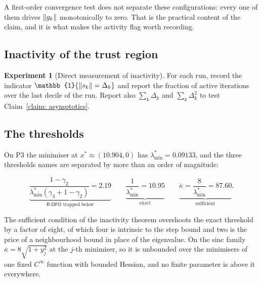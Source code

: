 \documentclass[11pt]{article}
\theoremstyle{plain}
\theoremstyle{definition}
\newtheorem{experiment}{Experiment}
\theoremstyle{remark}
\numberwithin{equation}{section}
\newcommand{\Rdfo}{\textsf{R-DFO}}
\providecommand{\kbar}{\overline{\kappa}}
\providecommand{\kbar}{\overline{\kappa}}
\begin{document}
A first-order convergence test does not separate these configurations: every one
of them drives $\left \lVert g_k \right \rVert$ monotonically to zero. That is the practical content
of the claim, and it is what makes the activity flag worth recording.


\subsection{Inactivity of the trust region}
\label{sec: exp inactivity}

\begin{experiment}[Direct measurement of inactivity]
\label{exp: inactivity}
For each run, record the indicator $\mathbb{1}\{\norm{s_k} = \Delta_k\}$ and report the fraction
of active iterations over the last decile of the run. Report also $\sum_k \Delta_k$ and
$\sum_k \Delta_k^2$ to test Claim~\ref{claim: asymptotics}.
\end{experiment}

\subsection{The thresholds}
\label{sec: res thresholds}

On P3 the minimiser at $x^* \approx (10.904, 0)$ has
$\lambda^*_{\min} = 0.09133$, and the three thresholds \PartII{} names are
separated by more than an order of magnitude:

\begin{equation}
  \underbrace{\frac{1-\gamma_2}{\lambda^*_{\min}(\gamma_3+1-\gamma_2)} = 2.19}_{\text{$\Rdfo$ trapped below}}
  \qquad
  \underbrace{\frac{1}{\lambda^*_{\min}} = 10.95}_{\text{exact}}
  \qquad
  \underbrace{\kbar = \frac{8}{\lambda^*_{\min}} = 87.60}_{\text{sufficient}} .
  \label{eqn: three thresholds}
\end{equation}

The sufficient condition of the inactivity theorem overshoots the exact threshold
by a factor of eight, of which four is intrinsic to the step bound and two is the
price of a neighbourhood bound in place of the eigenvalue. On the sinc family
$\kbar = 8\sqrt{1+y_j^2}$ at the $j$-th minimiser, so it is unbounded over the
minimisers of one fixed $C^\infty$ function with bounded Hessian, and no finite
parameter is above it everywhere.
\end{document}

